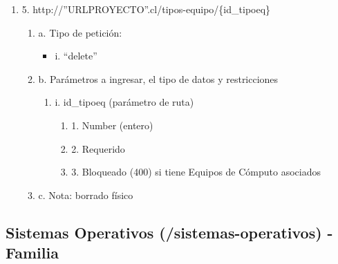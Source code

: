 \begin{enumerate}
    \item 5. http://”URLPROYECTO”.cl/tipos-equipo/\{id\_tipoeq\}
    \begin{enumerate}
        \item a. Tipo de petición:
            \begin{itemize}
               \item i. “delete”
            \end{itemize}
        \item b. Parámetros a ingresar, el tipo de datos y restricciones
            \begin{enumerate}
                \item i. id\_tipoeq (parámetro de ruta)
                    \begin{enumerate}
                        \item 1. Number (entero)
                        \item 2. Requerido
                        \item 3. Bloqueado (400) si tiene Equipos de Cómputo asociados
                    \end{enumerate}
            \end{enumerate}
        \item c. Nota: borrado físico
    \end{enumerate}
\end{enumerate}

\subsection{Sistemas Operativos (/sistemas-operativos) - Familia}

